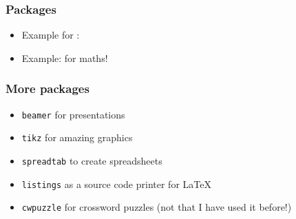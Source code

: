 \documentclass{beamer}
\def\openesc{\color{blue}}
\def\closeesc{\color{black}}
\def\vbdelim{\catcode`<=\active\catcode`>=\active%
\def<{\openesc}
\def>{\closeesc}}
\begin{document}
\begin{frame}[fragile] %
\frametitle{Packages}
\begin{itemize}
\item Example for \color{red}{multicol} \color{black}{}: \\
\end{itemize}
\pause
\begin{itemize}
\item Example: \color{red}{\verb|amsmath|} \color{black}{} for maths! \\
\end{itemize}


\end{frame}

\begin{frame}[fragile]
\frametitle{More packages}
\begin{itemize}
\item \verb|beamer| for presentations  \\
\item \verb|tikz| for amazing graphics \\
\item \verb|spreadtab| to create spreadsheets \\
\item \verb|listings| as a source code printer for \LaTeX \\
\item \verb|cwpuzzle| for crossword puzzles (not that I have used it before!) \\
\end{itemize}
\end{frame}
\end{document}
